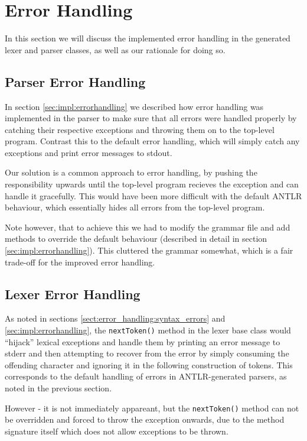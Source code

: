 \section{Error Handling}
\label{sect:discussion:error_handling}
In this section we will discuss the implemented error handling in the generated
lexer and parser classes, as well as our rationale for doing so. 

\subsection{Parser Error Handling}
In section \ref{sec:impl:errorhandling} we described how error handling was
implemented in the parser to make sure that all errors were handled properly by
catching their respective exceptions and throwing them on to the top-level
program. Contrast this to the default error handling, which will simply catch
any exceptions and print error messages to stdout.

Our solution is a common approach to error handling, by pushing the
responsibility upwards until the top-level program recieves the exception and
can handle it gracefully. This would have been more difficult with the default
ANTLR behaviour, which essentially hides all errors from the top-level program.

Note however, that to achieve this we had to modify the grammar file and add
methods to override the default behaviour (described in detail in section
\ref{sec:impl:errorhandling}). This cluttered the grammar somewhat, which is a
fair trade-off for the improved error handling.

\subsection{Lexer Error Handling}
\label{sect:future_work:lexer_error_handling} %
As noted in sections \ref{sect:error_handling:syntax_errors} and
\ref{sec:impl:errorhandling}, the \verb!nextToken()! method in the lexer base class
would ``hijack'' lexical exceptions and handle them by printing an error message
to stderr and then attempting to recover from the error by simply consuming the
offending character and ignoring it in the following construction of tokens.
This corresponds to the default handling of errors in ANTLR-generated parsers,
as noted in the previous section.

However - it is not immediately appareant, but the \verb!nextToken()! method can
not be overridden and forced to throw the exception onwards, due to the method
signature itself which does not allow exceptions to be thrown. 

